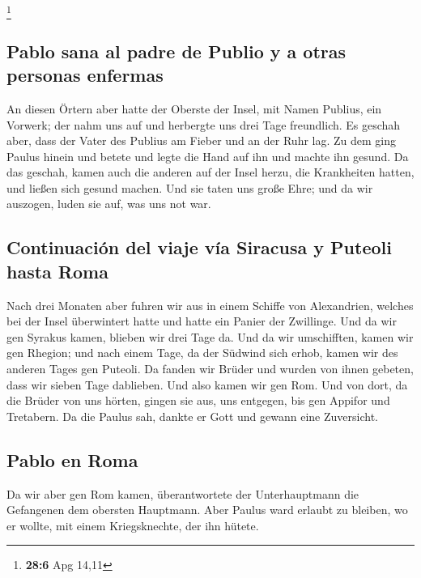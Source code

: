 \footnote{\textbf{28:6} Apg 14,11}

\hypertarget{pablo-sana-al-padre-de-publio-y-a-otras-personas-enfermas}{%
\subsection{Pablo sana al padre de Publio y a otras personas
enfermas}\label{pablo-sana-al-padre-de-publio-y-a-otras-personas-enfermas}}

 An diesen Örtern aber hatte der Oberste der Insel, mit
Namen Publius, ein Vorwerk; der nahm uns auf und herbergte uns drei Tage
freundlich.  Es geschah aber, dass der Vater des Publius
am Fieber und an der Ruhr lag. Zu dem ging Paulus hinein und betete und
legte die Hand auf ihn und machte ihn gesund.  Da das
geschah, kamen auch die anderen auf der Insel herzu, die Krankheiten
hatten, und ließen sich gesund machen.  Und sie taten uns
große Ehre; und da wir auszogen, luden sie auf, was uns not war.

\hypertarget{continuaciuxf3n-del-viaje-vuxeda-siracusa-y-puteoli-hasta-roma}{%
\subsection{Continuación del viaje vía Siracusa y Puteoli hasta
Roma}\label{continuaciuxf3n-del-viaje-vuxeda-siracusa-y-puteoli-hasta-roma}}

 Nach drei Monaten aber fuhren wir aus in einem Schiffe
von Alexandrien, welches bei der Insel überwintert hatte und hatte ein
Panier der Zwillinge.  Und da wir gen Syrakus kamen,
blieben wir drei Tage da.  Und da wir umschifften, kamen
wir gen Rhegion; und nach einem Tage, da der Südwind sich erhob, kamen
wir des anderen Tages gen Puteoli.  Da fanden wir Brüder
und wurden von ihnen gebeten, dass wir sieben Tage dablieben. Und also
kamen wir gen Rom.  Und von dort, da die Brüder von uns
hörten, gingen sie aus, uns entgegen, bis gen Appifor und Tretabern. Da
die Paulus sah, dankte er Gott und gewann eine Zuversicht.

\hypertarget{pablo-en-roma}{%
\subsection{Pablo en Roma}\label{pablo-en-roma}}

 Da wir aber gen Rom kamen, überantwortete der
Unterhauptmann die Gefangenen dem obersten Hauptmann. Aber Paulus ward
erlaubt zu bleiben, wo er wollte, mit einem Kriegsknechte, der ihn
hütete.

